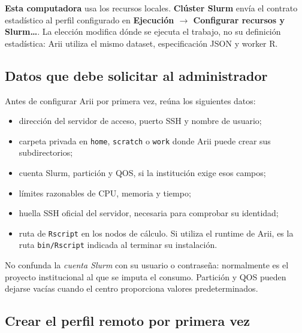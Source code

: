 \documentclass[11pt,a4paper,openany]{report}
\newcommand{\menu}[1]{\textbf{#1}}
\newcommand{\code}[1]{\texttt{#1}}
\begin{document}
\menu{Esta computadora} usa los recursos locales. \menu{Clúster Slurm} envía el
contrato estadístico al perfil configurado en
\menu{Ejecución \texorpdfstring{$\rightarrow$}{ > } Configurar recursos y
Slurm…}. La elección modifica dónde se ejecuta el trabajo, no su definición
estadística: Arii utiliza el mismo dataset, especificación JSON y worker R.

\subsection{Datos que debe solicitar al administrador}

Antes de configurar Arii por primera vez, reúna los siguientes datos:

\begin{itemize}
  \item dirección del servidor de acceso, puerto SSH y nombre de usuario;
  \item carpeta privada en \code{home}, \code{scratch} o \code{work} donde Arii
  puede crear sus subdirectorios;
  \item cuenta Slurm, partición y QOS, si la institución exige esos campos;
  \item límites razonables de CPU, memoria y tiempo;
  \item huella SSH oficial del servidor, necesaria para comprobar su identidad;
  \item ruta de \code{Rscript} en los nodos de cálculo. Si utiliza el runtime de
  Arii, es la ruta \code{bin/Rscript} indicada al terminar su instalación.
\end{itemize}

No confunda la \emph{cuenta Slurm} con su usuario o contraseña: normalmente es el
proyecto institucional al que se imputa el consumo. Partición y QOS pueden
dejarse vacías cuando el centro proporciona valores predeterminados.

\newpage

\subsection{Crear el perfil remoto por primera vez}
\end{document}

